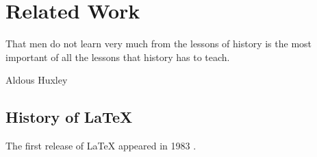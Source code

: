 \section{Related Work}
\label{ch:related}

\epigraph{That men do not learn very much from the lessons of history is the most important of all the lessons that history has to teach.}{Aldous Huxley}

\subsection{History of \LaTeX}

The first release of \LaTeX \cite{lamport1994latex} appeared in 1983 \cite{lamport2007writings}.

\cleardoublepage